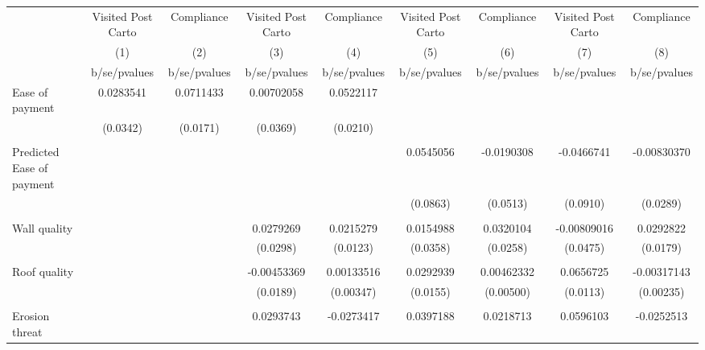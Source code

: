 {
\def\sym#1{\ifmmode^{#1}\else\(^{#1}\)\fi}
\begin{tabular}{l*{8}{c}}
\toprule
                &\multicolumn{1}{c}{Visited Post Carto}&\multicolumn{1}{c}{Compliance}&\multicolumn{1}{c}{Visited Post Carto}&\multicolumn{1}{c}{Compliance}&\multicolumn{1}{c}{Visited Post Carto}&\multicolumn{1}{c}{Compliance}&\multicolumn{1}{c}{Visited Post Carto}&\multicolumn{1}{c}{Compliance}\\
                &\multicolumn{1}{c}{(1)}&\multicolumn{1}{c}{(2)}&\multicolumn{1}{c}{(3)}&\multicolumn{1}{c}{(4)}&\multicolumn{1}{c}{(5)}&\multicolumn{1}{c}{(6)}&\multicolumn{1}{c}{(7)}&\multicolumn{1}{c}{(8)}\\
                &b/se/pvalues&b/se/pvalues&b/se/pvalues&b/se/pvalues&b/se/pvalues&b/se/pvalues&b/se/pvalues&b/se/pvalues\\
\midrule
Ease of payment &0.0283541&0.0711433&0.00702058&0.0522117&         &         &         &         \\
                & (0.0342)& (0.0171)& (0.0369)& (0.0210)&         &         &         &         \\
                &         &         &         &         &         &         &         &         \\
Predicted Ease of payment&         &         &         &         &0.0545056&-0.0190308&-0.0466741&-0.00830370\\
                &         &         &         &         & (0.0863)& (0.0513)& (0.0910)& (0.0289)\\
                &         &         &         &         &         &         &         &         \\
Wall quality    &         &         &0.0279269&0.0215279&0.0154988&0.0320104&-0.00809016&0.0292822\\
                &         &         & (0.0298)& (0.0123)& (0.0358)& (0.0258)& (0.0475)& (0.0179)\\
                &         &         &         &         &         &         &         &         \\
Roof quality    &         &         &-0.00453369&0.00133516&0.0292939&0.00462332&0.0656725&-0.00317143\\
                &         &         & (0.0189)&(0.00347)& (0.0155)&(0.00500)& (0.0113)&(0.00235)\\
                &         &         &         &         &         &         &         &         \\
Erosion threat  &         &         &0.0293743&-0.0273417&0.0397188&0.0218713&0.0596103&-0.0252513\\

\end{tabular}}
